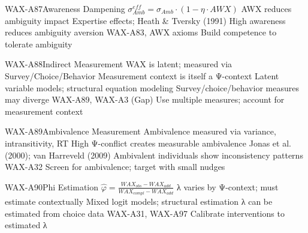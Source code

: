 \begin{axiomspec}{WAX-A87}{Awareness Dampening}
 $\sigma_{Amb}^{eff} = \sigma_{Amb} \cdot (1 - \eta \cdot AWX)$
 AWX reduces ambiguity impact
 Expertise effects; Heath \& Tversky (1991)
 High awareness reduces ambiguity aversion
 WAX-A83, AWX axioms
 Build competence to tolerate ambiguity
\end{axiomspec}


\begin{axiomspec}{WAX-A88}{Indirect Measurement}
 WAX is latent; measured via Survey/Choice/Behavior
 Measurement context is itself a Ψ-context
 Latent variable models; structural equation modeling
 Survey/choice/behavior measures may diverge
 WAX-A89, WAX-A3 (Gap)
 Use multiple measures; account for measurement context
\end{axiomspec}

\begin{axiomspec}{WAX-A89}{Ambivalence Measurement}
 Ambivalence measured via variance, intransitivity, RT
 High Ψ-conflict creates measurable ambivalence
 Jonas et al. (2000); van Harreveld (2009)
 Ambivalent individuals show inconsistency patterns
 WAX-A32
 Screen for ambivalence; target with small nudges
\end{axiomspec}

\begin{axiomspec}{WAX-A90}{Phi Estimation}
 $\hat{\varphi} = \frac{WAX_{obs} - WAX_{add}}{WAX_{compl} - WAX_{add}}$
 λ varies by Ψ-context; must estimate contextually
 Mixed logit models; structural estimation
 λ can be estimated from choice data
 WAX-A31, WAX-A97
 Calibrate interventions to estimated λ
\end{axiomspec}


